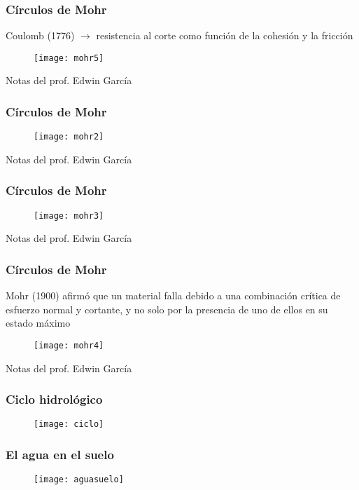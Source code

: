 \documentclass[12pt]{beamer}
\begin{document}
\begin{frame}
\frametitle{Círculos de Mohr}
\scriptsize{Coulomb (1776) $\rightarrow$ resistencia al corte como función de la cohesión y la fricción}
\begin{figure}
\centering
\texttt{[image: mohr5]}
\end{figure}
\tiny{Notas del prof. Edwin García}
\end{frame}
\begin{frame}
\frametitle{Círculos de Mohr}
\begin{figure}
\centering
\texttt{[image: mohr2]}
\end{figure}
\tiny{Notas del prof. Edwin García}
\end{frame}
\begin{frame}
\frametitle{Círculos de Mohr}
\begin{figure}
\centering
\texttt{[image: mohr3]}
\end{figure}
\tiny{Notas del prof. Edwin García}
\end{frame}
\begin{frame}
\frametitle{Círculos de Mohr}
\scriptsize{Mohr (1900) afirmó que un material falla debido a una combinación crítica de esfuerzo normal y cortante, y no solo por la presencia de uno de ellos en su estado máximo}
\begin{figure}
\centering
\texttt{[image: mohr4]}
\end{figure}
\tiny{Notas del prof. Edwin García}
\end{frame}
\begin{frame}
\frametitle{Ciclo hidrológico}
\begin{figure}
\centering
\texttt{[image: ciclo]}
\end{figure}
\end{frame}
\begin{frame}
\frametitle{El agua en el suelo}
\begin{figure}
\centering
\texttt{[image: aguasuelo]}
\end{figure}
\end{frame}
\end{document}
